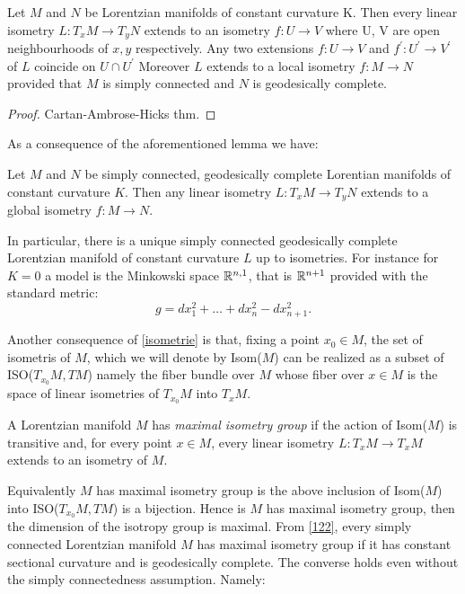 \begin{lemma}\label{isometrie} Let $M$ and $N$ be Lorentzian manifolds of constant curvature K. Then every linear isometry $L:T_{x}M\to T_yN$ extends to an isometry $f:U\to V$ where U, V are open neighbourhoods of $x,y$ respectively. Any two extensions $f:U\to V$ and $f^{\prime}:U^{\prime} \to V^{\prime} $ of $L$ coincide on $U\cap U^{\prime} $ Moreover $L$ extends to a local isometry $f:M\to N$ provided that $M$ is simply connected and $N$ is geodesically complete. 
\end{lemma}
\begin{proof}
    Cartan-Ambrose-Hicks thm.
\end{proof}
As a consequence of the aforementioned lemma we have: 
\begin{corollary}\label{122}
    Let $M$ and $N$ be simply connected, geodesically complete Lorentian manifolds of constant curvature $K$. Then any linear isometry $L:T_xM\to T_yN$ extends to a global isometry $f:M\to N.$   
\end{corollary}

In particular, there is a unique simply connected geodesically complete Lorentzian manifold of constant curvature $L$ up to isometries. For instance for $K=0$ a model is the Minkowski space $\mathbb{R}^{n,1}$, that is $\mathbb{R}^{n+1}$ provided with the standard metric: 
\[
    g=dx_1^{2}+\dots+dx_n^{2}-dx_{n+1}^2.   
\]

Another consequence of \ref{isometrie} is that, fixing a point $x_0 \in M$, the set of isometris of $M$, which we will denote by Isom($M$) can be realized as a subset of ISO($T_{x_0}M, TM$) namely the fiber bundle over $M$ whose fiber over $x\in M$ is the space of linear isometries of $T_{x_0}M$ into $T_{x}M$. 

\begin{definition}
    A Lorentzian manifold $M$ has \textit{maximal isometry group} if the action of Isom($M$) is transitive and, for every point $x \in M$, every linear isometry $L:T_{x}M\to T_xM$ extends to an isometry of $M$. 
\end{definition}

Equivalently $M$ has maximal isometry group is the above inclusion of Isom($M$) into ISO($T_{x_0}M, TM$) is a bijection. Hence is $M$ has maximal isometry group, then the dimension of the isotropy group is maximal. 
From \ref{122}, every simply connected Lorentzian manifold $M$ has maximal isometry group if it has constant sectional curvature and is geodesically complete. The converse holds even without the simply connectedness assumption. Namely: 

